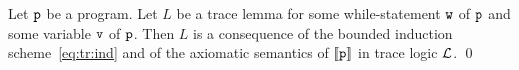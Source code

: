 \begin{theorem}
	Let $\texttt{p}$ be a program. Let $L$ be a trace lemma for some
	while-statement $\texttt{w}$ of $\texttt{p}$ and some variable $\texttt{v}$ of
	$\texttt{p}$.
	Then $L$ is a consequence of the bounded induction
	scheme~\eqref{eq:tr:ind} and of the axiomatic semantics of $\llbracket
	\texttt{p} \rrbracket$ in trace logic $\mathcal{L}$.
	\qed
\end{theorem}
%
%

